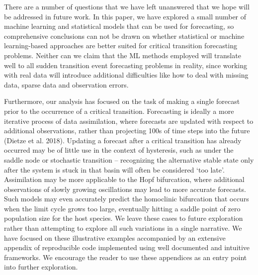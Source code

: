 \documentclass{article}
\begin{document}
There are a number of questions that we have left unanswered that we
hope will be addressed in future work. In this paper, we have explored a
small number of machine learning and statistical models that can be used
for forecasting, so comprehensive conclusions can not be drawn on
whether statistical or machine learning-based approaches are better
suited for critical transition forecasting problems. Neither can we
claim that the ML methods employed will translate well to all sudden
transition event forecasting problems in reality, since working with
real data will introduce additional difficulties like how to deal with
missing data, sparse data and observation errors.

Furthermore, our analysis has focused on the task of making a single
forecast prior to the occurrence of a critical transition. Forecasting
is ideally a more iterative process of data assimilation, where
forecasts are updated with respect to additional observations, rather
than projecting 100s of time steps into the future (Dietze et al. 2018).
Updating a forecast after a critical transition has already occurred may
be of little use in the context of hysteresis, such as under the saddle
node or stochastic transition -- recognizing the alternative stable
state only after the system is stuck in that basin will often be
considered `too late'. Assimilation may be more applicable to the Hopf
bifurcation, where additional observations of slowly growing
oscillations may lead to more accurate forecasts. Such models may even
accurately predict the homoclinic bifurcation that occurs when the limit
cycle grows too large, eventually hitting a saddle point of zero
population size for the host species. We leave these cases to future
exploration rather than attempting to explore all such variations in a
single narrative. We have focused on these illustrative examples
accompanied by an extensive appendix of reproducible code implemented
using well documented and intuitive frameworks. We encourage the reader
to use these appendices as an entry point into further exploration.
\end{document}
